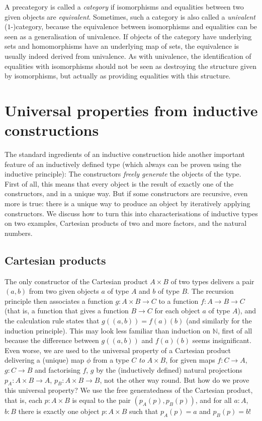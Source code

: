 \documentclass{amsart}
\theoremstyle{plain}
\numberwithin{equation}{section} %
\numberwithin{figure}{section} %
\theoremstyle{plain}
\theoremstyle{plain}
\theoremstyle{plain}
\theoremstyle{plain}
\theoremstyle{plain}
\theoremstyle{plain}
\theoremstyle{remark}
\theoremstyle{remark}
\theoremstyle{remark}
\begin{document}
A precategory is called a \textit{category} if isomorphisms and equalities between two given objects are \textit{equivalent}. Sometimes, such a category is also called a \textit{univalent} \mbox{($1$-)category}, because the equivalence between isomorphisms and equalities can be seen as a generalisation of univalence. If objects of the category have underlying sets and homomorphisms have an underlying map of sets, the equivalence is usually indeed derived from univalence. As with univalence, the identification of equalities with isomorphisms should not be seen as destroying the structure given by isomorphisms, but actually as providing equalities with this structure. 


\section{Universal properties from inductive constructions} \label{ind-cons-sec}

The standard ingredients of an inductive construction hide another important feature of an inductively defined type (which always can be proven using the inductive principle): The constructors \textit{freely generate} the objects of the type. First of all, this means that every object is the result of exactly one of the constructors, and in a unique way. But if some constructors are recursive, even more is true: there is a unique way to produce an object by iteratively applying constructors. We discuss how to turn this into characterisations of inductive types on two examples, Cartesian products of two and more factors, and the natural numbers.

\subsection{Cartesian products} \label{set-prod-ssec}

The only constructor of the Cartesian product $A \times B$ of two types delivers a pair $(a, b)$ from two given objects $a$ of type $A$ and $b$ of type $B$. The recursion principle then associates a function $g : A \times B \rightarrow C$ to a function $f : A \rightarrow B \rightarrow C$ (that is, a function that gives a function $B \rightarrow C$ for each object $a$ of type $A$), and the calculation rule states that $g((a,b)) = f(a)(b)$ (and similarly for the induction principle). This may look less familiar than induction on $\mathbb{N}$, first of all because the difference between $g((a,b))$ and $f(a)(b)$ seems insignificant. Even worse, we are used to the universal property of a Cartesian product delivering a (unique) map $\phi$ from a type $C$ \textit{to} $A \times B$, for given maps $f: C \rightarrow A$, $g : C \rightarrow B$ and factorising $f$, $g$ by the (inductively defined) natural projections $p_A : A \times B \rightarrow A$, $p_B : A \times B \rightarrow B$, not the other way round. But how do we prove this universal property? We use the free generatedness of the Cartesian product, that is, each $p : A \times B$ is equal to the pair $(p_A(p), p_B(p))$, and for all $a : A$, $b : B$ there is exactly one object $p : A \times B$ such that $p_A(p) = a$ and $p_B(p) = b$! 
\end{document}
